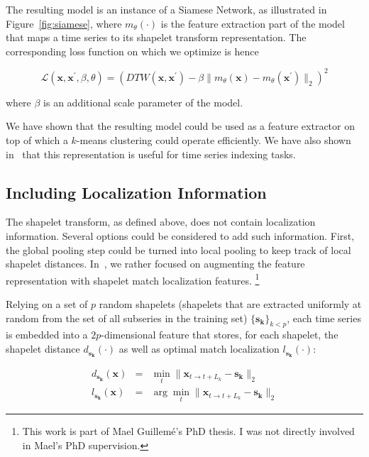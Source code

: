 The resulting model is an instance of a Siamese Network, as illustrated in
Figure~\ref{fig:siamese},
where $m_\theta(\cdot)$ is the feature extraction part of the model that
maps a time series to its shapelet transform representation.
The corresponding loss function on which we optimize is hence

\begin{equation}
    \mathcal{L}(\mathbf{x}, \mathbf{x}^\prime, \beta, \theta) =
        \left(
            DTW(\mathbf{x}, \mathbf{x}^\prime) -
                \beta \| m_\theta(\mathbf{x}) - m_\theta(\mathbf{x}^\prime) \|_2
        \right)^2
\end{equation}

\noindent
where $\beta$ is an additional scale parameter of the model.

We have shown that the resulting model could be used as a feature extractor on top of
which a $k$-means clustering could operate efficiently.
We have also shown in~\cite{carlinisperandio:hal-01841995} that this
representation is useful for time series indexing tasks.

\subsection{Including Localization Information}

The shapelet transform, as defined above, does not contain localization
information. Several options could be considered to add such
information. First, the global pooling step could be turned into local pooling
to keep track of local shapelet distances.
In~\cite{guilleme:hal-02513295}, we rather focused on augmenting the feature
representation with shapelet match localization features.%
\footnote{This work is part of Mael Guillemé's PhD thesis.
I was not directly involved in Mael's PhD supervision.}

Relying on a set of $p$ random shapelets (shapelets that are extracted
uniformly at
random from the set of all subseries in the training set)
$\{\mathbf{s_k}\}_{k < p}$,
each time series is embedded into a $2p$-dimensional feature that stores, for
each shapelet, the shapelet distance $d_{\mathbf{s_k}}(\cdot)$ as well as
optimal  match localization $l_{\mathbf{s_k}}(\cdot)$:

\begin{eqnarray}
    d_{\mathbf{s_k}}(\mathbf{x}) &=& \min_t
        \|\mathbf{x}_{t \rightarrow t+L_k} - \mathbf{s_k}\|_2 \\
    l_{\mathbf{s_k}}(\mathbf{x}) &=& \arg \min_t
        \|\mathbf{x}_{t \rightarrow t+L_k} - \mathbf{s_k}\|_2
\end{eqnarray}

